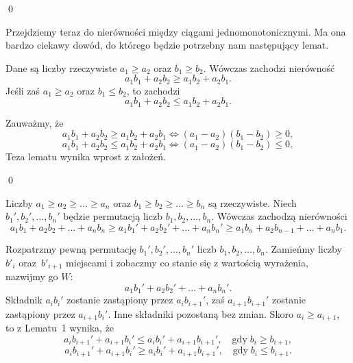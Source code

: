 \qed
\newpage

\noindent


\noindent
Przejdziemy teraz do nierówności między ciągami jednomonotonicznymi. Ma ona bardzo ciekawy dowód, do którego będzie potrzebny nam następujący lemat.

\vspace{10px}


\noindent
Dane są liczby rzeczywiste $a_1 \geqslant a_2$ oraz $b_1 \geqslant b_2$. Wówczas zachodzi nierówność
\[
	a_1b_1 + a_2b_2 \geqslant a_1b_2 + a_2b_1.
\] 
Jeśli zaś $a_1 \geqslant a_2$ oraz $b_1 \leqslant b_2$, to zachodzi
\[
	a_1b_1 + a_2b_2 \leqslant a_1b_2 + a_2b_1.
\] 


\noindent
Zauważmy, że
\[
	a_1b_1 + a_2b_2 \geqslant a_1b_2 + a_2b_1 \iff (a_1 - a_2)(b_1 - b_2) \geqslant 0,
\]
\[
	a_1b_1 + a_2b_2 \leqslant a_1b_2 + a_2b_1 \iff (a_1 - a_2)(b_1 - b_2) \leqslant 0,
\]
Teza lematu wynika wprost z założeń.

\qed

\vspace{10px}



\noindent
Liczby $a_1 \geqslant a_2 \geqslant ... \geqslant a_n$ oraz $b_1 \geqslant b_2 \geqslant ... \geqslant b_n$ są rzeczywiste. Niech $b_1', b_2', ..., b_n'$ będzie permutacją liczb $b_1, b_2, ..., b_n$. Wówczas zachodzą nierówności
\[
	a_1b_1 + a_2b_2 + ... + a_nb_n \geqslant a_1b_1' + a_2b_2' + ... + a_nb_n' \geqslant a_1b_n + a_2b_{n - 1} + ... + a_nb_1.
\]


\noindent
Rozpatrzmy pewną permutację $b_1', b_2', ..., b_n'$ liczb $b_1, b_2, ..., b_n$.  Zamieńmy liczby $b'_i$ oraz~$b'_{i + 1}$ miejscami i zobaczmy co stanie się z wartością wyrażenia, nazwijmy go $W$:
\[
	a_1b_1' + a_2b_2' + ... + a_nb_n'.
\]
Składnik $a_ib_i'$ zostanie zastąpiony przez $a_ib_{i + 1}'$, zaś $a_{i + 1}b_{i + 1}'$ zostanie zastąpiony przez $a_{i + 1}b_i'$. Inne składniki pozostaną bez zmian. Skoro $a_i \geqslant a_{i + 1}$, to z Lematu~1 wynika, że
\[
	a_ib_{i + 1}' + a_{i + 1}b_i' \leqslant a_ib_i' + a_{i + 1}b_{i + 1}', \quad \text{gdy} \; b_i \geqslant b_{i + 1},
\]
\[
	a_ib_{i + 1}' + a_{i + 1}b_i' \geqslant a_ib_i' + a_{i + 1}b_{i + 1}', \quad \text{gdy} \; b_i \leqslant b_{i + 1}.
\]

